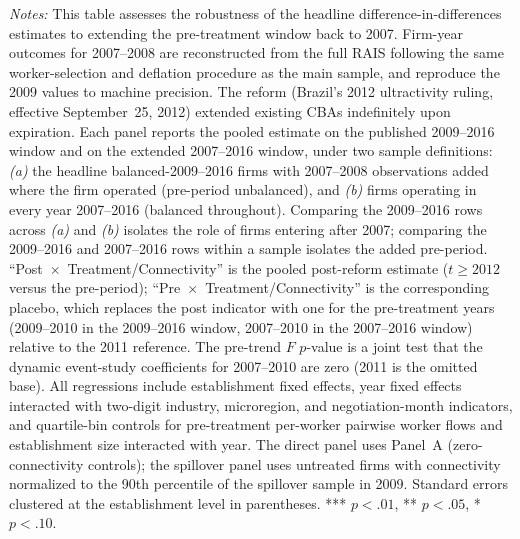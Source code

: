 \begin{table}[!htbp]
\begin{threeparttable}
\begin{tablenotes}
\item \textit{Notes:} This table assesses the robustness of the headline difference-in-differences estimates to extending the pre-treatment window back to 2007. Firm-year outcomes for 2007--2008 are reconstructed from the full RAIS following the same worker-selection and deflation procedure as the main sample, and reproduce the 2009 values to machine precision. The reform (Brazil's 2012 ultractivity ruling, effective September~25, 2012) extended existing CBAs indefinitely upon expiration. Each panel reports the pooled estimate on the published 2009--2016 window and on the extended 2007--2016 window, under two sample definitions: \textit{(a)} the headline balanced-2009--2016 firms with 2007--2008 observations added where the firm operated (pre-period unbalanced), and \textit{(b)} firms operating in every year 2007--2016 (balanced throughout). Comparing the 2009--2016 rows across \textit{(a)} and \textit{(b)} isolates the role of firms entering after 2007; comparing the 2009--2016 and 2007--2016 rows within a sample isolates the added pre-period. ``Post~$\times$~Treatment/Connectivity'' is the pooled post-reform estimate ($t\geq2012$ versus the pre-period); ``Pre~$\times$~Treatment/Connectivity'' is the corresponding placebo, which replaces the post indicator with one for the pre-treatment years (2009--2010 in the 2009--2016 window, 2007--2010 in the 2007--2016 window) relative to the 2011 reference. The pre-trend $F$ $p$-value is a joint test that the dynamic event-study coefficients for 2007--2010 are zero (2011 is the omitted base). All regressions include establishment fixed effects, year fixed effects interacted with two-digit industry, microregion, and negotiation-month indicators, and quartile-bin controls for pre-treatment per-worker pairwise worker flows and establishment size interacted with year. The direct panel uses Panel~A (zero-connectivity controls); the spillover panel uses untreated firms with connectivity normalized to the 90th percentile of the spillover sample in 2009. Standard errors clustered at the establishment level in parentheses. *** $p<.01$, ** $p<.05$, * $p<.10$.
\end{tablenotes}
\end{threeparttable}
\end{table}
